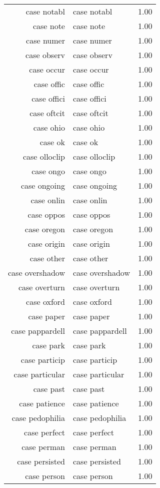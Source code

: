 \begin{table}[ht]
\begin{tabular}{rlr}
  case notabl & case notabl & 1.00 \\ 
  case note & case note & 1.00 \\ 
  case numer & case numer & 1.00 \\ 
  case observ & case observ & 1.00 \\ 
  case occur & case occur & 1.00 \\ 
  case offic & case offic & 1.00 \\ 
  case offici & case offici & 1.00 \\ 
  case oftcit & case oftcit & 1.00 \\ 
  case ohio & case ohio & 1.00 \\ 
  case ok & case ok & 1.00 \\ 
  case olloclip & case olloclip & 1.00 \\ 
  case ongo & case ongo & 1.00 \\ 
  case ongoing & case ongoing & 1.00 \\ 
  case onlin & case onlin & 1.00 \\ 
  case oppos & case oppos & 1.00 \\ 
  case oregon & case oregon & 1.00 \\ 
  case origin & case origin & 1.00 \\ 
  case other & case other & 1.00 \\ 
  case overshadow & case overshadow & 1.00 \\ 
  case overturn & case overturn & 1.00 \\ 
  case oxford & case oxford & 1.00 \\ 
  case paper & case paper & 1.00 \\ 
  case pappardell & case pappardell & 1.00 \\ 
  case park & case park & 1.00 \\ 
  case particip & case particip & 1.00 \\ 
  case particular & case particular & 1.00 \\ 
  case past & case past & 1.00 \\ 
  case patience & case patience & 1.00 \\ 
  case pedophilia & case pedophilia & 1.00 \\ 
  case perfect & case perfect & 1.00 \\ 
  case perman & case perman & 1.00 \\ 
  case persisted & case persisted & 1.00 \\ 
  case person & case person & 1.00 \\ 

\end{tabular}
\end{table}
